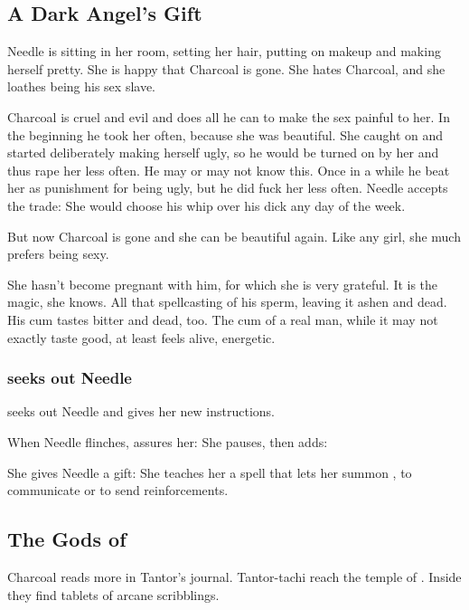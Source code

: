 \begin{garbage}
\subsection{A Dark Angel's Gift}
Needle is sitting in her room, setting her hair, putting on makeup and making herself pretty. She is happy that Charcoal is gone. She hates Charcoal, and she loathes being his sex slave. 

Charcoal is cruel and evil and does all he can to make the sex painful to her. In the beginning he took her often, because she was beautiful. She caught on and started deliberately making herself ugly, so he would be turned on by her and thus rape her less often. He may or may not know this. Once in a while he beat her as punishment for being ugly, but he did fuck her less often. Needle accepts the trade: She would choose his whip over his dick any day of the week. 

But now Charcoal is gone and she can be beautiful again. Like any girl, she much prefers being sexy. 

She hasn't become pregnant with him, for which she is very grateful. It is the magic, she knows. All that spellcasting  of his sperm, leaving it ashen and dead. His cum tastes bitter and dead, too. The cum of a real man, while it may not exactly taste good, at least feels alive, energetic. 





\subsubsection{\Achsah{} seeks out Needle}
\hs{\Achsah} seeks out Needle and gives her new instructions. 

When Needle flinches, \Achsah{} assures her: 
She pauses, then adds: 

She gives Needle a gift: She teaches her a spell that lets her summon \Achsah{}, to communicate or to send reinforcements. 







\subsection{The Gods of \EreshKal}
Charcoal reads more in Tantor's journal. Tantor-tachi reach the temple of \Rungertemple. Inside they find tablets of arcane scribblings. 


\end{garbage}
